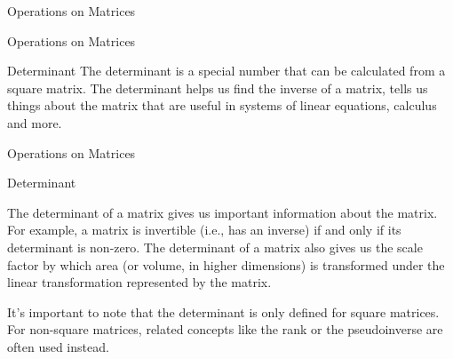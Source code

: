\documentclass[aspectratio=169,xcolor=dvipsnames,svgnames,x11names,fleqn]{beamer}
\begin{document}
\begin{frame}[containsverbatim]{Operations on Matrices}



\end{frame}
\begin{frame}[containsverbatim]{Operations on Matrices}




\begin{tblock}{Determinant}
The determinant is a special number that can be calculated from a square matrix. The determinant helps us find the inverse of a matrix, tells us things about the matrix that are useful in systems of linear equations, calculus and more.

\end{tblock}

\end{frame}

\begin{frame}[containsverbatim]{Operations on Matrices}



\begin{tblock}{Determinant}

The determinant of a matrix gives us important information about the matrix. For example, a matrix is invertible (i.e., has an inverse) if and only if its determinant is non-zero. The determinant of a matrix also gives us the scale factor by which area (or volume, in higher dimensions) is transformed under the linear transformation represented by the matrix. 

It's important to note that the determinant is only defined for square matrices. For non-square matrices, related concepts like the rank or the pseudoinverse are often used instead.

\end{tblock}

\end{frame}
\end{document}
